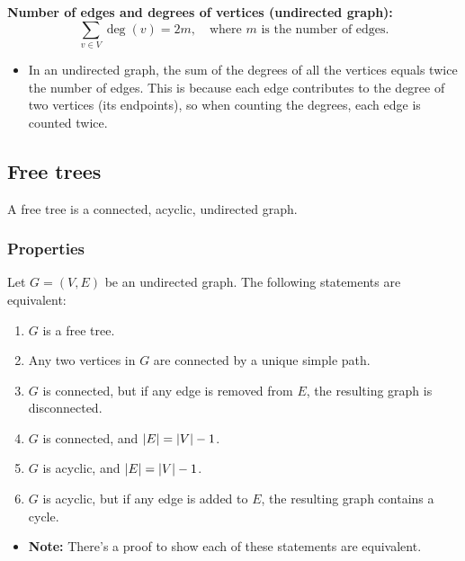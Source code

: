 \begin{example}
        \textbf{Number of edges and degrees of vertices (undirected graph):}
        \[
        \sum_{v \in V} \deg(v) = 2m, \quad \text{where } m \text{ is the number of edges.}
        \]
        \begin{itemize}
            \item In an undirected graph, the sum of the degrees of all the vertices equals twice the number of edges. This is because each edge contributes to the degree of two vertices (its endpoints), so when counting the degrees, each edge is counted twice.
        \end{itemize}
    \end{example}

\subsection{Free trees}
    \begin{definition}
        A free tree is a connected, acyclic, undirected graph. 
    \end{definition}

    \subsubsection{Properties}
    \begin{definition}
        Let $G=(V,E)$ be an undirected graph. The following statements are equivalent:
        \begin{enumerate}
            \item $G$ is a free tree. 
            \item Any two vertices in $G$ are connected by a unique simple path. 
            \item $G$ is connected, but if any edge is removed from $E$, the resulting graph is disconnected. 
            \item $G$ is connected, and $\abs{E} = \abs{V} - 1$.
            \item $G$ is acyclic, and $\abs{E} = \abs{V} - 1$.
            \item $G$ is acyclic, but if any edge is added to $E$, the resulting graph contains a cycle.
        \end{enumerate}
        \begin{itemize}
            \item \textbf{Note:} There's a proof to show each of these statements are equivalent.
        \end{itemize}
    \end{definition}

